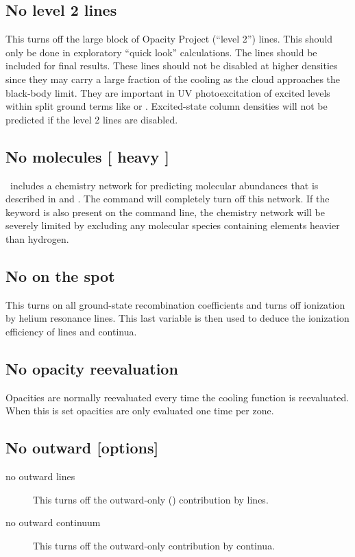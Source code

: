 \subsection{No level 2 lines}

This turns off the large block of Opacity Project (``level 2'') lines.
This should only be done in exploratory ``quick look'' calculations.
The lines should be included for final results.
These lines should not
be disabled at higher densities since they may carry a large fraction of
the cooling as the cloud approaches the black-body limit.
They are
important in UV photoexcitation of excited levels within
split ground terms like \oi* or \cii*.
Excited-state column densities will not be predicted if
the level 2 lines are disabled.

\subsection{No molecules [ heavy ]}

\Cloudy\ includes a chemistry network for predicting molecular abundances that
is described in \citet{Abel2005} and \citet{Roellig2007}. The  command will completely turn off this network. If the keyword
 is also present on the command line, the chemistry network
will be severely limited by excluding any molecular species containing
elements heavier than hydrogen.

\subsection{No on the spot}

This turns on all ground-state recombination coefficients and turns off
ionization by helium resonance lines.
This last variable is then used to
deduce the ionization efficiency of lines and continua.

\subsection{No opacity reevaluation}

Opacities are normally reevaluated every time the cooling function is
reevaluated.
When this is set opacities are only evaluated one time per zone.

\subsection{No outward [options]  }
\begin{description}
\item[no outward lines]  This turns off the outward-only (\citealp{Tarter1967})
contribution by lines.

\item[no outward continuum]  This turns off the outward-only contribution by
continua.
\end{description}


